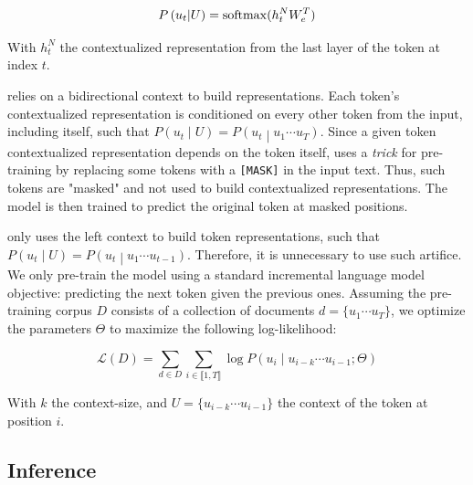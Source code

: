 \begin{equation}
    P\left(u_t \middle| U \right) = \softmax(h_t^N W_e^T) \labeq{generative:token-proba} \\
\end{equation}

With $h_t^N$ the contextualized representation from the last layer of the token at index $t$. 

\bert relies on a bidirectional context to build representations. Each token’s contextualized representation is conditioned on every other token from the input, including itself, such that $P\left(u_t \middle| U \right) = P\left(u_t \middle| u_1 \cdots u_T \right)$. Since a given token contextualized representation depends on the token itself, \bert uses a \textit{trick} for pre-training by replacing some tokens with a \texttt{[MASK]} in the input text. Thus, such tokens are "masked" and not used to build contextualized representations. The model is then trained to predict the original token at masked positions. 

\gpt only uses the left context to build token representations, such that $P\left(u_t \middle| U \right) = P\left(u_t \middle| u_1 \cdots u_{t-1} \right)$. Therefore, it is unnecessary to use such artifice. We only pre-train the model using a standard incremental language model objective: predicting the next token given the previous ones. Assuming the pre-training corpus $D$ consists of a collection of documents $d=\{u_1 \cdots u_T\}$, we optimize the \gpt parameters $\Theta$ to maximize the following log-likelihood:%

\begin{equation}
    \mathcal{L}(D) = \sum_{d \in D}\sum_{i \in \llbracket 1, T \rrbracket} \log P\left(u_{i} \middle| u_{i-k} \cdots u_{i-1}; \Theta\right)
\end{equation}

With $k$ the context-size, and $U=\{u_{i-k} \cdots u_{i-1}\}$ the context of the token at position $i$.


\subsection{Inference}

